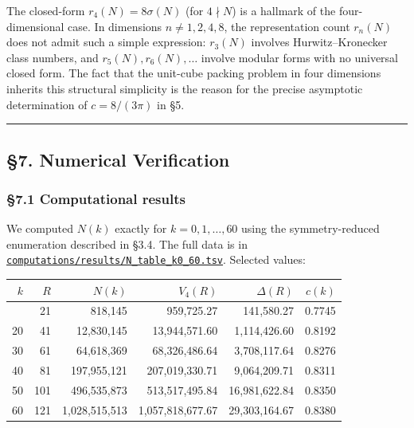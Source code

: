 \documentclass[a4paper,11pt]{article}
\theoremstyle{definition}
\begin{document}
The closed-form \(r_4(N) = 8\sigma(N)\) (for \(4 \nmid N\)) is a
hallmark of the four-dimensional case. In dimensions
\(n \neq 1, 2, 4, 8\), the representation count \(r_n(N)\) does not
admit such a simple expression: \(r_3(N)\) involves Hurwitz--Kronecker
class numbers, and \(r_5(N), r_6(N), \ldots\) involve modular forms with
no universal closed form. The fact that the unit-cube packing problem in
four dimensions inherits this structural simplicity is the reason for
the precise asymptotic determination of \(c = 8/(3\pi)\) in §5.

\begin{center}\rule{0.5\linewidth}{0.5pt}\end{center}

\subsection{§7. Numerical Verification}\label{numerical-verification}

\subsubsection{§7.1 Computational results}\label{computational-results}

We computed \(N(k)\) exactly for \(k = 0, 1, \ldots, 60\) using the
symmetry-reduced enumeration described in §3.4. The full data is in
\href{../../computations/results/N_table_k0_60.tsv}{\texttt{computations/results/N\_table\_k0\_60.tsv}}.
Selected values:

{\def\LTcaptype{none} %
\begin{longtable}[]{@{}rrrrrr@{}}
\toprule\noalign{}
\(k\) & \(R\) & \(N(k)\) & \(V_4(R)\) & \(\Delta(R)\) & \(c(k)\) \\
\midrule\noalign{}
\endhead
\bottomrule\noalign{}
\endlastfoot
10 & 21 & 818,145 & 959,725.27 & 141,580.27 & 0.7745 \\
20 & 41 & 12,830,145 & 13,944,571.60 & 1,114,426.60 & 0.8192 \\
30 & 61 & 64,618,369 & 68,326,486.64 & 3,708,117.64 & 0.8276 \\
40 & 81 & 197,955,121 & 207,019,330.71 & 9,064,209.71 & 0.8311 \\
50 & 101 & 496,535,873 & 513,517,495.84 & 16,981,622.84 & 0.8350 \\
60 & 121 & 1,028,515,513 & 1,057,818,677.67 & 29,303,164.67 & 0.8380 \\
\end{longtable}
}
\end{document}
